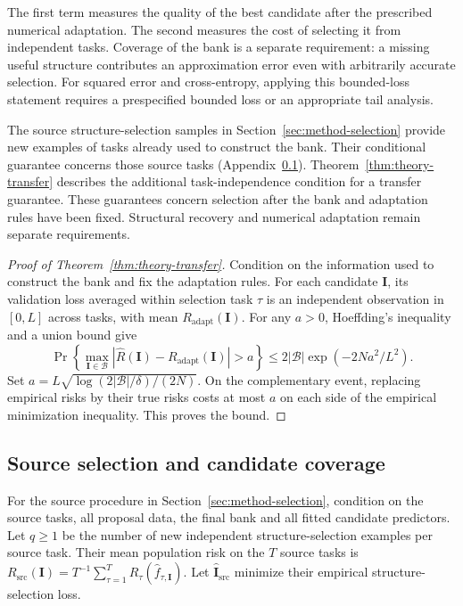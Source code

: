 The first term measures the quality of the best candidate after
the prescribed numerical adaptation. The second measures the cost
of selecting it from independent tasks.
Coverage of the bank is a separate requirement: a missing useful
structure contributes an approximation error even with arbitrarily
accurate selection.
For squared error and cross-entropy, applying this bounded-loss
statement requires a prespecified bounded loss or an appropriate
tail analysis.

The source structure-selection samples in
Section~\ref{sec:method-selection} provide new examples of tasks
already used to construct the bank.
Their conditional guarantee concerns those source tasks
(Appendix~\ref{app:theory-selection}).
Theorem~\ref{thm:theory-transfer} describes the additional
task-independence condition for a transfer guarantee.
These guarantees concern selection after the bank and adaptation rules
have been fixed. Structural recovery and numerical adaptation remain
separate requirements.

\begin{proof}[Proof of Theorem~\ref{thm:theory-transfer}]
    Condition on the information used to construct the bank and
    fix the adaptation rules.
    For each candidate $\mathbf I$, its validation loss averaged
    within selection task $\tau$ is an independent observation
    in $[0,L]$ across tasks, with mean
    $R_{\mathrm{adapt}}(\mathbf I)$.
    For any $a>0$, Hoeffding's inequality and a union bound give
    \begin{equation*}
        \Pr\left\{
            \max_{\mathbf I\in\mathcal B}
            \left|\widehat R(\mathbf I)
                -R_{\mathrm{adapt}}(\mathbf I)\right|
                >a
            \right\}
        \le 2|\mathcal B|\exp(-2Na^2/L^2).
    \end{equation*}
    Set $a=L\sqrt{\log(2|\mathcal B|/\delta)/(2N)}$.
    On the complementary event, replacing empirical risks by
    their true risks costs at most $a$ on each side of the
    empirical minimization inequality. This proves the bound.
\end{proof}

\subsection{Source selection and candidate coverage}
\label{app:theory-selection}

For the source procedure in
Section~\ref{sec:method-selection}, condition on the source tasks,
all proposal data, the final bank and all fitted candidate predictors.
Let $q\ge1$ be the number of new independent
structure-selection examples per source task.
Their mean population risk on the $T$ source tasks is
$R_{\mathrm{src}}(\mathbf I)=T^{-1}\sum_{\tau=1}^T
R_\tau(\widehat f_{\tau,\mathbf I})$. Let
$\widehat{\mathbf I}_{\mathrm{src}}$ minimize their empirical
structure-selection loss.

